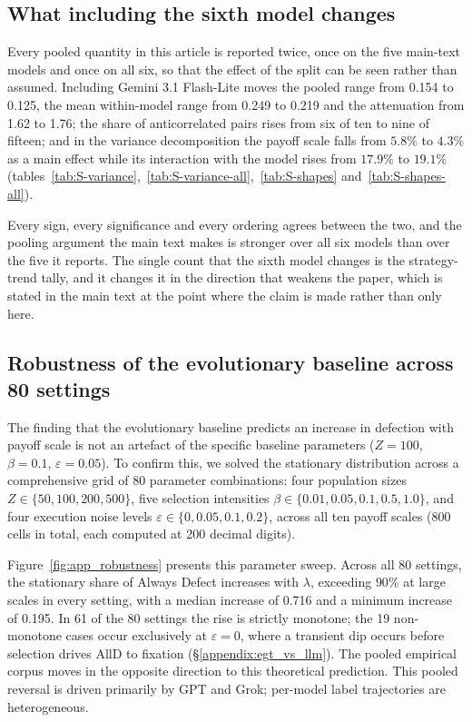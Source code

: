 \documentclass[openacc]{rsproca_new}
\newcommand{\lam}{\lambda}
\begin{document}
\subsection{What including the sixth model changes}\label{appendix:robust_sixth}

Every pooled quantity in this article is reported twice, once on the five
main-text models and once on all six, so that the effect of the split can be
seen rather than assumed. Including Gemini 3.1 Flash-Lite moves the pooled
range from 0.154 to 0.125, the mean within-model range from 0.249 to 0.219 and
the attenuation from 1.62 to 1.76; the share of anticorrelated pairs rises from
six of ten to nine of fifteen; and in the variance decomposition the payoff
scale falls from $5.8\%$ to $4.3\%$ as a main effect while its interaction with
the model rises from $17.9\%$ to $19.1\%$
(tables~\ref{tab:S-variance},~\ref{tab:S-variance-all},~\ref{tab:S-shapes}
and~\ref{tab:S-shapes-all}).

Every sign, every significance and every ordering agrees between the two, and
the pooling argument the main text makes is stronger over all six models than
over the five it reports. The single count that the sixth model changes is the
strategy-trend tally, and it changes it in the direction that weakens the
paper, which is stated in the main text at the point where the claim is made
rather than only here.

\subsection{Robustness of the evolutionary baseline across 80 settings}\label{appendix:robust_egt}

The finding that the evolutionary baseline predicts an increase in defection
with payoff scale is not an artefact of the specific baseline parameters
($Z = 100$, $\beta = 0.1$, $\varepsilon = 0.05$). To confirm this, we solved the
stationary distribution across a comprehensive grid of 80 parameter combinations:
four population sizes $Z \in \{50, 100, 200, 500\}$, five selection intensities
$\beta \in \{0.01, 0.05, 0.1, 0.5, 1.0\}$, and four execution noise levels
$\varepsilon \in \{0, 0.05, 0.1, 0.2\}$, across all ten payoff scales (800 cells
in total, each computed at 200 decimal digits).

Figure~\ref{fig:app_robustness} presents this parameter sweep. Across all 80
settings, the stationary share of Always Defect increases with $\lam$, exceeding
$90\%$ at large scales in every setting, with a median increase of 0.716 and a
minimum increase of 0.195. In 61 of the 80 settings the rise is strictly
monotone; the 19 non-monotone cases occur exclusively at $\varepsilon = 0$,
where a transient dip occurs before selection drives AllD to fixation
(\S\ref{appendix:egt_vs_llm}). The pooled empirical corpus moves in the
opposite direction to this theoretical prediction. This pooled reversal is
driven primarily by GPT and Grok; per-model label trajectories are heterogeneous.
\end{document}
